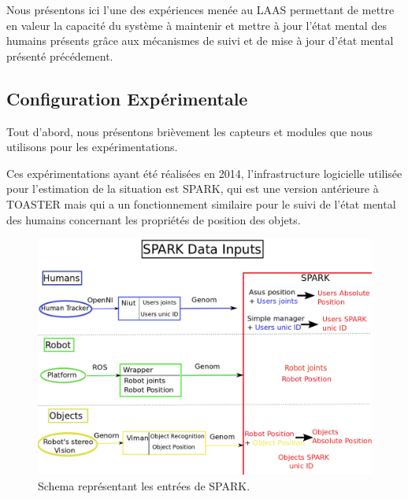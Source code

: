 \documentclass[a4paper,11pt,twoside]{StyleThese}
\begin{document}
Nous présentons ici l'une des expériences menée au LAAS permettant de mettre en valeur la capacité du système à maintenir et mettre à jour l'état mental des humains présents grâce aux mécanismes de suivi et de mise à jour d'état mental présenté précédement.

\subsection{Configuration Expérimentale}
Tout d'abord, nous présentons brièvement les capteurs et modules que nous utilisons pour les expérimentations.


Ces expérimentations ayant été réalisées en 2014, l'infrastructure logicielle utilisée pour l'estimation de la situation est SPARK\cite{Milliez2014}, qui est une version antérieure à TOASTER mais qui a un fonctionnement similaire pour le suivi de l'état mental des humains concernant les propriétés de position des objets.

\begin{figure}[ht!]
  \centering
 \includegraphics[width=0.99\linewidth]{./img/spark_input.png} 
  \caption {Schema représentant les entrées de SPARK.}
  \label{fig:inputSpark}
\end{figure}
\end{document}
